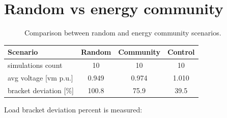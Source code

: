 \documentclass[a4paper,10pt]{report}
\begin{document}
\section{Random vs energy community}
\FloatBarrier
\begin{figure}[htpb]
	\centering
	\qquad
	\caption{Comparison between random and energy community scenarios.}%
	\label{random_vs_en_comm}%
\end{figure}
\FloatBarrier


\begin{table}[htpb]
	\centering
	\begin{tabular}{lccc}
		\toprule
		Scenario & Random & Community & Control \\
		\midrule
		simulations count & 10 & 10 & 10 \\
		avg voltage [vm p.u.] & 0.949 & 0.974 & 1.010 \\
		bracket deviation [\%] & 100.8 & 75.9 & 39.5 \\
		\bottomrule
	\end{tabular}
\label{random_vs_comm}
\end{table}

Load bracket deviation percent is measured:
\end{document}
